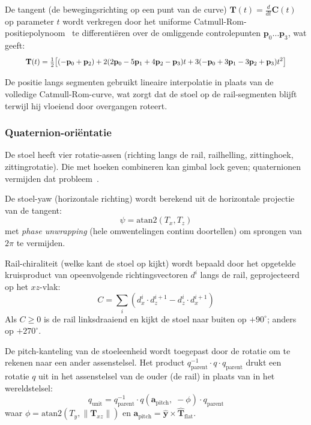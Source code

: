 \documentclass[10pt, a4paper, twocolumn]{article}
\begin{document}
De tangent (de bewegingsrichting op een punt van de curve) $\mathbf{T}(t) = \tfrac{d}{dt}\mathbf{C}(t)$ op parameter $t$ wordt
verkregen door het uniforme Catmull-Rom-positiepolynoom~\cite{catmullrom1974} te
differentiëren over de omliggende controlepunten
$\mathbf{p}_0 \ldots \mathbf{p}_3$, wat geeft:
\begin{equation}
\label{eq:catmullrom-tangent}
\resizebox{0.9\columnwidth}{!}{$\displaystyle
\mathbf{T}(t) = \tfrac{1}{2}\bigl[
  (-\mathbf{p}_0 + \mathbf{p}_2)
  + 2(2\mathbf{p}_0 - 5\mathbf{p}_1 + 4\mathbf{p}_2 - \mathbf{p}_3)t
  + 3(-\mathbf{p}_0 + 3\mathbf{p}_1 - 3\mathbf{p}_2 + \mathbf{p}_3)t^2
\bigr]
$}
\end{equation}

De positie langs segmenten gebruikt lineaire interpolatie in plaats van de
volledige Catmull-Rom-curve, wat zorgt dat de stoel op de rail-segmenten blijft
terwijl hij vloeiend door overgangen roteert.

\subsubsection{Quaternion-oriëntatie}
De stoel heeft vier rotatie-assen (richting langs de rail, railhelling,
zittinghoek, zittingrotatie). Die met hoeken combineren kan gimbal lock geven;
quaternionen vermijden dat probleem~\cite{kuipers1999quaternions}.

De stoel-yaw (horizontale richting) wordt berekend uit de horizontale projectie
van de tangent:
\begin{equation}
\label{eq:yaw}
\psi = \text{atan2}(T_x, T_z)
\end{equation}
met \emph{phase unwrapping} (hele omwentelingen continu doortellen) om sprongen van $2\pi$ te vermijden.

Rail-chiraliteit (welke kant de stoel op kijkt) wordt bepaald door het
opgetelde kruisproduct van opeenvolgende richtingsvectoren $d^i$ langs de rail,
geprojecteerd op het $xz$-vlak:
\begin{equation}
\label{eq:chirality}
C = \sum_i (d^i_x \cdot d^{i+1}_z - d^i_z \cdot d^{i+1}_x)
\end{equation}
Als $C \geq 0$ is de rail linksdraaiend en kijkt de stoel naar buiten op
$+90^\circ$; anders op $+270^\circ$.

De pitch-kanteling van de stoeleenheid wordt toegepast door de rotatie om te
rekenen naar een ander assenstelsel. Het product $q_{\text{parent}}^{-1} \cdot q \cdot q_{\text{parent}}$
drukt een rotatie $q$ uit in het assenstelsel van de ouder (de rail) in plaats
van in het wereldstelsel:
\begin{equation}
\label{eq:pitch-quat}
q_{\text{unit}} = q_{\text{parent}}^{-1} \cdot q(\mathbf{a}_{\text{pitch}},\; -\phi) \cdot q_{\text{parent}}
\end{equation}
waar $\phi = \text{atan2}(T_y, \|\mathbf{T}_{xz}\|)$ en
$\mathbf{a}_{\text{pitch}} = \hat{\mathbf{y}} \times \hat{\mathbf{T}}_{\text{flat}}$.
\end{document}
